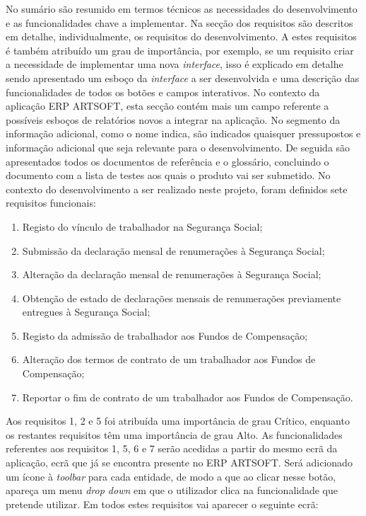 \documentclass[sigplan]{acmart}
\begin{document}
No sumário são resumido em termos técnicos as necessidades do desenvolvimento e as funcionalidades chave a implementar. Na secção dos requisitos são descritos em detalhe, individualmente, os requisitos do desenvolvimento. A estes requisitos é também atribuído um grau de importância, por exemplo, se um requisito criar a necessidade de implementar uma nova \textit{interface}, isso é explicado em detalhe sendo apresentado um esboço da \textit{interface} a ser desenvolvida e uma descrição das funcionalidades de todos os botões e campos interativos. No contexto da aplicação ERP ARTSOFT, esta secção contém mais um campo referente a possíveis esboços de relatórios novos a integrar na aplicação. No segmento da informação adicional, como o nome indica, são indicados quaisquer pressupostos e informação adicional que seja relevante para o desenvolvimento. De seguida são apresentados todos os documentos de referência e o glossário, concluindo o documento com a lista de testes aos quais o produto vai ser submetido. No contexto do desenvolvimento a ser realizado neste projeto, foram definidos sete requisitos funcionais:
\begin{enumerate}
  \item Registo do vínculo de trabalhador na Segurança Social;
  \item Submissão da declaração mensal de renumerações à Segurança Social;
  \item Alteração da declaração mensal de renumerações à Segurança Social;
  \item Obtenção de estado de declarações mensais de renumerações previamente entregues à Segurança Social;
  \item Registo da admissão de trabalhador aos Fundos de Compensação;
  \item Alteração dos termos de contrato de um trabalhador aos Fundos de Compensação;
  \item Reportar o fim de contrato de um trabalhador aos Fundos de Compensação.
\end{enumerate}
Aos requisitos 1, 2 e 5 foi atribuída uma importância de grau Crítico, enquanto os restantes requisitos têm uma importância de grau Alto. As funcionalidades referentes aos requisitos 1, 5, 6 e 7 serão acedidas a partir do mesmo ecrã da aplicação, ecrã que já se encontra presente no ERP ARTSOFT. Será adicionado um ícone à \textit{toolbar} para cada entidade, de modo a que ao clicar nesse botão, apareça um menu \textit{drop down} em que o utilizador clica na funcionalidade que pretende utilizar. Em todos estes requisitos vai aparecer o seguinte ecrã:
\end{document}
